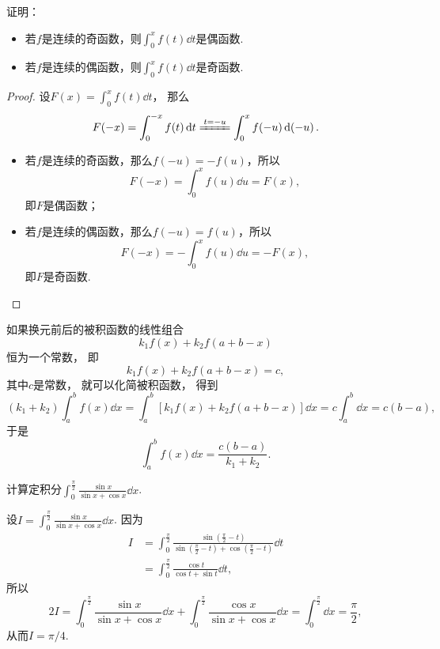 \begin{proposition}
证明：\begin{itemize}
	\item 若\(f\)是连续的奇函数，则\(\int_0^x f(t) \dd{t}\)是偶函数.
	\item 若\(f\)是连续的偶函数，则\(\int_0^x f(t) \dd{t}\)是奇函数.
\end{itemize}
\begin{proof}
设\(F(x) = \int_0^x f(t) \dd{t}\)，
那么\[
	F(-x) = \int_0^{-x} f(t) \dd{t}
	\xlongequal{t=-u} \int_0^x f(-u) \dd(-u).
\]
\begin{itemize}
	\item 若\(f\)是连续的奇函数，那么\(f(-u) = -f(u)\)，所以\[
		F(-x) = \int_0^x f(u) \dd{u} = F(x),
	\]
	即\(F\)是偶函数；

	\item 若\(f\)是连续的偶函数，那么\(f(-u) = f(u)\)，所以\[
		F(-x) = -\int_0^x f(u) \dd{u} = -F(x),
	\]
	即\(F\)是奇函数.
	\qedhere
\end{itemize}
\end{proof}
\end{proposition}

如果换元前后的被积函数的线性组合\[
	k_1 f(x) + k_2 f(a+b-x)
\]恒为一个常数，
即\[
	k_1 f(x) + k_2 f(a+b-x) = c,
\]
其中\(c\)是常数，
就可以化简被积函数，
得到\[
	(k_1 + k_2) \int_a^b f(x) \dd{x}
	= \int_a^b [k_1 f(x) + k_2 f(a+b-x)] \dd{x}
	= c \int_a^b \dd{x} = c(b-a),
\]
于是\[
	\int_a^b f(x) \dd{x}
	= \frac{c(b-a)}{k_1 + k_2}.
\]

\begin{example}
计算定积分\(\int_0^{\frac{\pi}{2}} \frac{\sin x}{\sin x + \cos x} \dd{x}\).
\begin{solution}
设\(I = \int_0^{\frac{\pi}{2}} \frac{\sin x}{\sin x + \cos x} \dd{x}\).
因为
\begin{align*}
	I &= \int_0^{\frac{\pi}{2}}
		\frac{\sin\left(\frac{\pi}{2}-t\right)}
			{\sin\left(\frac{\pi}{2}-t\right) + \cos\left(\frac{\pi}{2}-t\right)}
		\dd{t} \\
	&= \int_0^{\frac{\pi}{2}} \frac{\cos t}{\cos t + \sin t} \dd{t},
\end{align*}
所以\[
	2 I = \int_0^{\frac{\pi}{2}} \frac{\sin x}{\sin x + \cos x} \dd{x}
		+ \int_0^{\frac{\pi}{2}} \frac{\cos x}{\sin x + \cos x} \dd{x}
	= \int_0^{\frac{\pi}{2}} \dd{x}
	= \frac{\pi}{2},
\]
从而\(I = \pi/4\).
\end{solution}
\end{example}

